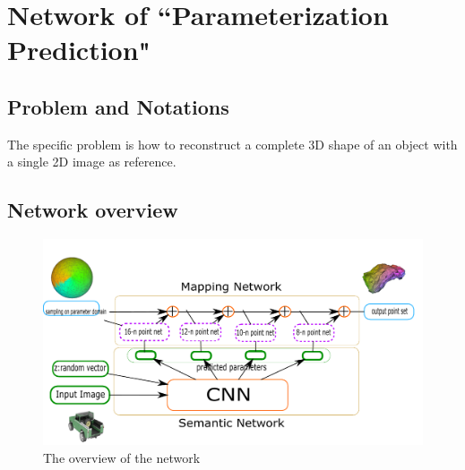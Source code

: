 \section{Network of ``Parameterization Prediction"}
\subsection{Problem and Notations}
The specific problem is how to reconstruct a complete 3D shape of an object with a single 2D image as reference. 
\subsection{Network overview}
\begin{figure}[htbp]
	\centering
	\includegraphics[width=\linewidth]{img/net/overview}
	\caption{The overview of the network}
	\label{fig:overview}
\end{figure}
